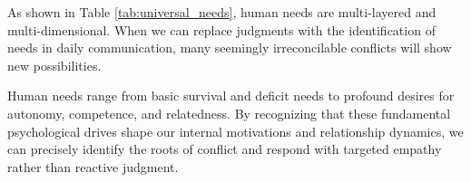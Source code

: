 As shown in Table \ref{tab:universal_needs}, human needs are multi-layered
and multi-dimensional.
When we can replace judgments with the identification of needs in daily
communication, many seemingly irreconcilable conflicts will show new
possibilities.

\begin{keyinsight}
Human needs range from basic survival and deficit needs to profound desires
for autonomy, competence, and relatedness.
By recognizing that these fundamental psychological drives shape our internal
motivations and relationship dynamics, we can precisely identify the roots of
conflict and respond with targeted empathy rather than reactive judgment.
\end{keyinsight}
